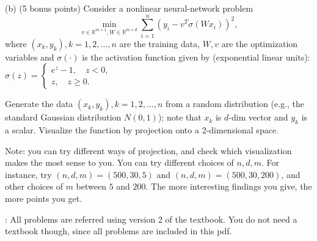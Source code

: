 \documentclass[11pt,letterpaper]{article}
\begin{document}
\begin{enumerate}
(b) (5 bonus points) Consider a nonlinear neural-network problem 
$$
\min_{ v \in \mathbb{R}^{m \times 1},  W \in  \mathbb{R}^{m \times d}   }  
 \sum_{i = 1}^n  ( y_i - v^T \sigma ( W  x_i ) )^2 ,   %
$$
where $(x_k, y_k), k=1,2, \dots, n $ are the training data, $W, v $ are the optimization variables and  $\sigma(\cdot) $ is the activation function given by (exponential linear units):
$\sigma( z) = \begin{cases}
e^z - 1,  \quad z < 0,  \\
z      ,  \quad z \geq 0. 
\end{cases}$

Generate the data $(x_k, y_k), k=1,2, \dots, n $ from a random distribution (e.g., the standard Gaussian distribution $N(0,1)$); note that $x_k$ is $d$-dim vector and $y_k$ is a scalar. 
Visualize the function by projection onto a 2-dimensional space. 

Note: you can try different ways of projection, and check which visualization makes the most sense to you. 
You can try different choices of $ n , d,  m$.
For instance, try $ (n ,d , m)  =  ( 500, 30,  5   )    $ and $ (n ,d , m)  =  ( 500, 30,  200   )  $, and other choices
of $m$ between $5$ and $200$. 
The more interesting findings you give, the more points you get. 
 



\end{enumerate}


: All problems are referred using version 2 of the textbook.
You do not need a textbook though, since all problems are included in this pdf. 

\end{document}
